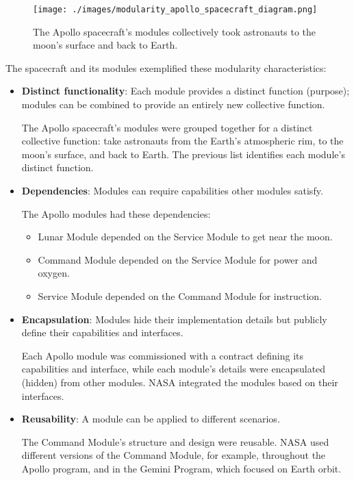 \begin{figure}
\centering
\texttt{[image: ./images/modularity\_apollo\_spacecraft\_diagram.png]}
\caption{The Apollo spacecraft's modules collectively took astronauts to
the moon's surface and back to Earth.}
\end{figure}

The spacecraft and its modules exemplified these modularity
characteristics:

\begin{itemize}
\item
  \textbf{Distinct functionality}: Each module provides a distinct
  function (purpose); modules can be combined to provide an entirely new
  collective function.

  The Apollo spacecraft's modules were grouped together for a distinct
  collective function: take astronauts from the Earth's atmospheric rim,
  to the moon's surface, and back to Earth. The previous list identifies
  each module's distinct function.
\item
  \textbf{Dependencies}: Modules can require capabilities other modules
  satisfy.

  The Apollo modules had these dependencies:

  \begin{itemize}
  \item
    Lunar Module depended on the Service Module to get near the moon.
  \item
    Command Module depended on the Service Module for power and oxygen.
  \item
    Service Module depended on the Command Module for instruction.
  \end{itemize}
\item
  \textbf{Encapsulation}: Modules hide their implementation details but
  publicly define their capabilities and interfaces.

  Each Apollo module was commissioned with a contract defining its
  capabilities and interface, while each module's details were
  encapsulated (hidden) from other modules. NASA integrated the modules
  based on their interfaces.
\item
  \textbf{Reusability}: A module can be applied to different scenarios.

  The Command Module's structure and design were reusable. NASA used
  different versions of the Command Module, for example, throughout the
  Apollo program, and in the Gemini Program, which focused on Earth
  orbit.
\end{itemize}

